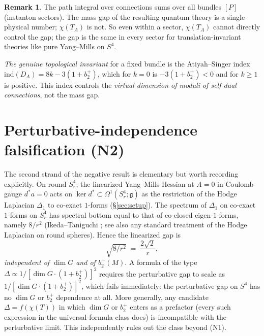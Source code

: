 \documentclass[11pt,letterpaper]{article}
\theoremstyle{definition}
\newtheorem{remark}[theorem]{Remark}
\newcommand{\fg}{\mathfrak{g}}
\newcommand{\Lap}{\Delta}
\begin{document}
\begin{remark}
The path integral over connections sums over all bundles $[P]$ (instanton sectors). The mass gap of the resulting quantum theory is a single physical number; $\chi(T_A)$ is not. So even within a sector, $\chi(T_A)$ cannot directly control the gap; the gap is the same in every sector for translation-invariant theories like pure Yang--Mills on $S^4$.

\emph{The genuine topological invariant} for a fixed bundle is the Atiyah--Singer index $\mathrm{ind}(D_A) = 8k - 3(1+b_2^+)$, which for $k=0$ is $-3(1+b_2^+) < 0$ and for $k\ge 1$ is positive. This index controls the \emph{virtual dimension of moduli of self-dual connections}, not the mass gap.
\end{remark}

\section{Perturbative-independence falsification (N2)}\label{sec:falsif}

The second strand of the negative result is elementary but worth recording explicitly. On round $S^4_r$, the linearized Yang--Mills Hessian at $A = 0$ in Coulomb gauge $d^* a = 0$ acts on $\ker d^* \subset \Omega^1(S^4_r; \fg)$ as the restriction of the Hodge Laplacian $\Lap_1$ to co-exact $1$-forms (\S\ref{sec:setup}). The spectrum of $\Lap_1$ on co-exact $1$-forms on $S^4_r$ has spectral bottom equal to that of co-closed eigen-$1$-forms, namely $8/r^2$ (Ikeda--Taniguchi \cite{IkedaTaniguchi1978}; see also any standard treatment of the Hodge Laplacian on round spheres). Hence the linearized gap is
\[
\sqrt{8/r^2} \;=\; \frac{2\sqrt{2}}{r},
\]
\emph{independent of $\dim G$ and of $b_2^+(M)$}. A formula of the type $\Delta \propto 1/[\dim G \cdot (1+b_2^+)]^2$ requires the perturbative gap to scale as $1/[\dim G \cdot (1+b_2^+)]^2$, which fails immediately: the perturbative gap on $S^4$ has no $\dim G$ or $b_2^+$ dependence at all. More generally, any candidate $\Delta = f(\chi(T))$ in which $\dim G$ or $b_2^+$ enters as a prefactor (every such expression in the universal-formula class does) is incompatible with the perturbative limit. This independently rules out the class beyond (N1).
\end{document}
